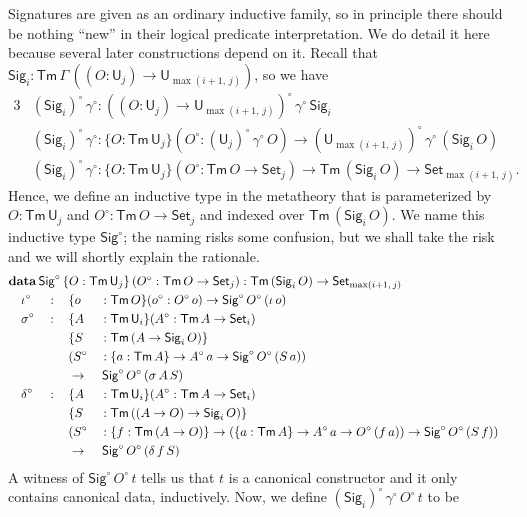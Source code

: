 \documentclass[acmsmall,screen,review]{acmart}
\newcommand{\msf}[1]{{\mathsf{#1}}}
\newcommand{\mbf}[1]{{\mathbf{#1}}}
\newcommand{\data}{\mbf{data}}
\newcommand{\U}{\msf{U}}
\newcommand{\Set}{\msf{Set}}
\newcommand{\Sig}{\msf{Sig}}
\newcommand{\Tm}{\msf{Tm}}
\newcommand{\w}{\circ}
\begin{document}
Signatures are given as an ordinary inductive family, so in principle there should be nothing
``new'' in their logical predicate interpretation. We do detail it here because several later
constructions depend on it. Recall that $\Sig_i : \Tm\,\Gamma\,((O : \U_j) \to \U_{\max(i+1,\,j)})$,
so we have
\begin{alignat*}{3}
  &(\Sig_i)^\w\,\gamma^\w : ((O : \U_j) \to \U_{\max(i+1,\,j)})^\w\,\gamma^\w\,\Sig_i\\
  &(\Sig_i)^\w\,\gamma^\w : \{O : \Tm\,\U_j\}(O^\w : (\U_j)^\w\,\gamma^\w\,O) \to (\U_{\max(i+1,\,j)})^\w\,\gamma^\w\,(\Sig_i\,O)\\
  &(\Sig_i)^\w\,\gamma^\w : \{O : \Tm\,\U_j\}(O^\w : \Tm\,O \to \Set_j) \to \Tm\,(\Sig_i\,O) \to \Set_{\max(i+1,\,j)}.
\end{alignat*}
Hence, we define an inductive type in the metatheory that is parameterized by $O : \Tm\,\U_j$ and
$O^\w : \Tm\,O \to \Set_j$ and indexed over $\Tm\,(\Sig_i\,O)$. We name this inductive type
$\Sig^\w$; the naming risks some confusion, but we shall take the risk and we will shortly
explain the rationale.
\begin{alignat*}{4}
  &\rlap{$\data\,\Sig^\w\,\{O : \Tm\,\U_j\}\,(O^\w : \Tm\,O \to \Set_j)  : \Tm\,(\Sig_i\,O) \to \Set_{\max(i+1,\,j)}$}\\
  &\quad \iota^\w  &&:\,&&\{o &&: \Tm\,O\}(o^\w : O^\w\,o) \to \Sig^\w\,O^\w\,(\iota\,o)\\
  &\quad \sigma^\w &&:\,&&\{A &&: \Tm\,\U_i\}(A^\w : \Tm\,A \to \Set_i)\\
  &               && &&\{S &&: \Tm\,(A \to \Sig_i\,O)\}\\
  &               && && (S^\w &&: \{a : \Tm\,A\} \to A^\w\,a \to \Sig^\w\,O^\w\,(S\,a))\\
  &               && && \to &&\,\Sig^\w\,O^\w\,(\sigma\,A\,S)\\
  &\quad \delta^\w &&:\,&&\{A &&: \Tm\,\U_i\}(A^\w : \Tm\,A \to \Set_i)\\
  &               &&   && \{S &&: \Tm\,((A \to O) \to \Sig_i\,O)\}\\
  &               &&   && (S^\w &&: \{f : \Tm\,(A \to O)\} \to (\{a : \Tm\,A\} \to A^\w\,a \to O^\w\,(f\,a)) \to \Sig^\w\,O^\w\,(S\,f))\\
  &\quad          &&   && \to &&\,\Sig^\w\,O^\w\,(\delta\,f\,S)
\end{alignat*}
A witness of $\Sig^\w\,O^\w\,t$ tells us that $t$ is a canonical constructor and it only contains
canonical data, inductively. Now, we define $(\Sig_i)^\w\,\gamma^\w\,O^\w\,t$ to be
\end{document}
